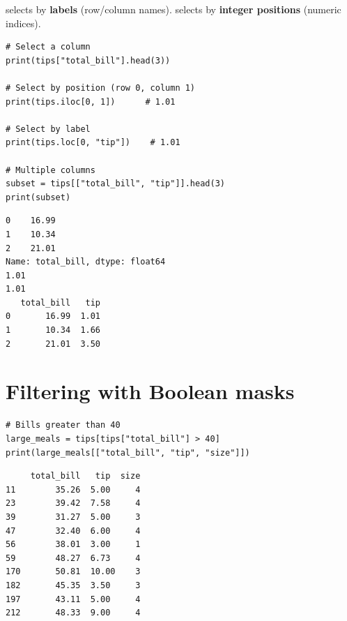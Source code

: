 \begin{definition}
 selects by \textbf{labels} (row/column names).
 selects by \textbf{integer positions} (numeric indices).
\end{definition}

\begin{codeblock}[title=\textbf{Python}]
\begin{verbatim}
# Select a column
print(tips["total_bill"].head(3))

# Select by position (row 0, column 1)
print(tips.iloc[0, 1])      # 1.01

# Select by label
print(tips.loc[0, "tip"])    # 1.01

# Multiple columns
subset = tips[["total_bill", "tip"]].head(3)
print(subset)
\end{verbatim}
\end{codeblock}

\begin{codeoutput}
\begin{verbatim}
0    16.99
1    10.34
2    21.01
Name: total_bill, dtype: float64
1.01
1.01
   total_bill   tip
0       16.99  1.01
1       10.34  1.66
2       21.01  3.50
\end{verbatim}
\end{codeoutput}

\section{Filtering with Boolean masks}

\begin{codeblock}[title=\textbf{Python}]
\begin{verbatim}
# Bills greater than 40
large_meals = tips[tips["total_bill"] > 40]
print(large_meals[["total_bill", "tip", "size"]])
\end{verbatim}
\end{codeblock}

\begin{codeoutput}
\begin{verbatim}
     total_bill   tip  size
11        35.26  5.00     4
23        39.42  7.58     4
39        31.27  5.00     3
47        32.40  6.00     4
56        38.01  3.00     1
59        48.27  6.73     4
170       50.81  10.00    3
182       45.35  3.50     3
197       43.11  5.00     4
212       48.33  9.00     4
\end{verbatim}
\end{codeoutput}

